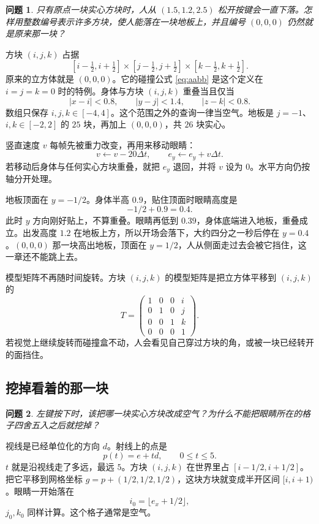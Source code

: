 \documentclass[12pt,a4paper]{article}
\theoremstyle{definition}
\theoremstyle{plain}
\newtheorem{problem}{问题}[section]
\theoremstyle{remark}
\begin{document}
\begin{problem}
只有原点一块实心方块时，人从 $(1.5,1.2,2.5)$ 松开按键会一直下落。怎样用整数编号表示许多方块，使人能落在一块地板上，并且编号 $(0,0,0)$ 仍然就是原来那一块？
\end{problem}

方块 $(i,j,k)$ 占据
\[
[i-\tfrac12,i+\tfrac12]\times[j-\tfrac12,j+\tfrac12]\times[k-\tfrac12,k+\tfrac12].
\]
原来的立方体就是 $(0,0,0)$。它的碰撞公式 \eqref{eq:aabb} 是这个定义在 $i=j=k=0$ 时的特例。身体与方块 $(i,j,k)$ 重叠当且仅当
\[
|x-i|<0.8,\qquad |y-j|<1.4,\qquad |z-k|<0.8.
\]
数组只保存 $i,j,k\in[-4,4]$。这个范围之外的查询一律当空气。地板是 $j=-1$、$i,k\in[-2,2]$ 的 $25$ 块，再加上 $(0,0,0)$，共 $26$ 块实心。

竖直速度 $v$ 每帧先被重力改变，再用来移动眼睛：
\[
v\leftarrow v-20\Delta t,\qquad e_y\leftarrow e_y+v\Delta t.
\]
若移动后身体与任何实心方块重叠，就把 $e_y$ 退回，并将 $v$ 设为 $0$。水平方向仍按轴分开处理。

地板顶面在 $y=-1/2$。身体半高 $0.9$，贴住顶面时眼睛高度是
\[
-1/2+0.9=0.4.
\]
此时 $y$ 方向刚好贴上，不算重叠。眼睛再低到 $0.39$，身体底端进入地板，重叠成立。出发高度 $1.2$ 在地板上方，所以开场会落下，大约四分之一秒后停在 $y=0.4$。$(0,0,0)$ 那一块高出地板，顶面在 $y=1/2$，人从侧面走过去会被它挡住，这一章还不能跳上去。

模型矩阵不再随时间旋转。方块 $(i,j,k)$ 的模型矩阵是把立方体平移到 $(i,j,k)$ 的
\[
T=
\begin{pmatrix}
1&0&0&i\\
0&1&0&j\\
0&0&1&k\\
0&0&0&1
\end{pmatrix}.
\]
若视觉上继续旋转而碰撞盒不动，人会看见自己穿过方块的角，或被一块已经转开的面挡住。

\subsection{挖掉看着的那一块}

\begin{problem}
左键按下时，该把哪一块实心方块改成空气？为什么不能把眼睛所在的格子四舍五入之后就挖掉？
\end{problem}

视线是已经单位化的方向 \(d\)。射线上的点是
\[
p(t)=e+td,\qquad 0\le t\le 5.
\]
\(t\) 就是沿视线走了多远，最远 \(5\)。方块 \((i,j,k)\) 在世界里占 \([i-1/2,i+1/2]\)。把它平移到网格坐标 \(g=p+(1/2,1/2,1/2)\)，这块方块就变成半开区间 \([i,i+1)\)。眼睛一开始落在
\[
i_0=\lfloor e_x+1/2\rfloor,
\]
\(j_0,k_0\) 同样计算。这个格子通常是空气。
\end{document}
